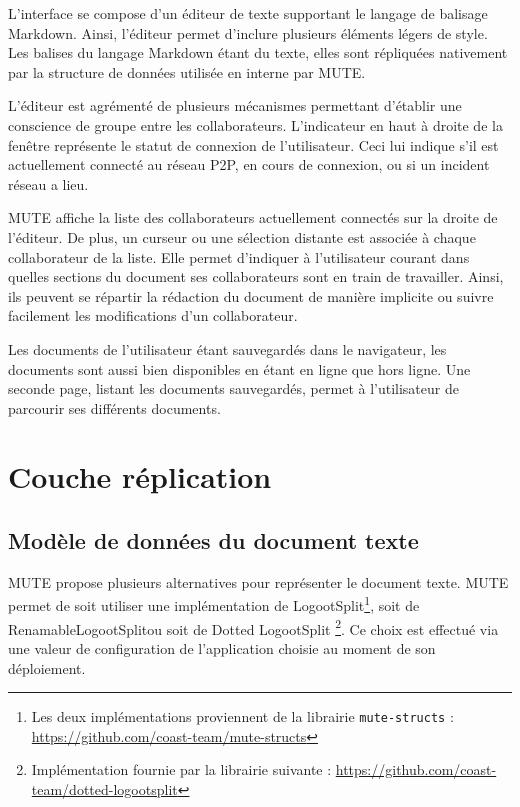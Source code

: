 \documentclass[12pt]{thesul}
\begin{document}
L'interface se compose d'un éditeur de texte supportant le langage de balisage Markdown.
Ainsi, l'éditeur permet d'inclure plusieurs éléments légers de style.
Les balises du langage Markdown étant du texte, elles sont répliquées nativement par la structure de données utilisée en interne par MUTE.

L'éditeur est agrémenté de plusieurs mécanismes permettant d'établir une conscience de groupe entre les collaborateurs.
L'indicateur en haut à droite de la fenêtre représente le statut de connexion de l'utilisateur.
Ceci lui indique s'il est actuellement connecté au réseau \ac{P2P}, en cours de connexion, ou si un incident réseau a lieu.

MUTE affiche la liste des collaborateurs actuellement connectés sur la droite de l'éditeur.
De plus, un curseur ou une sélection distante est associée à chaque collaborateur de la liste.
Elle permet d'indiquer à l'utilisateur courant dans quelles sections du document ses collaborateurs sont en train de travailler.
Ainsi, ils peuvent se répartir la rédaction du document de manière implicite ou suivre facilement les modifications d'un collaborateur.

Les documents de l'utilisateur étant sauvegardés dans le navigateur, les documents sont aussi bien disponibles en étant en ligne que hors ligne.
Une seconde page, listant les documents sauvegardés, permet à l'utilisateur de parcourir ses différents documents.

\section{Couche réplication}

\subsection{Modèle de données du document texte}

MUTE propose plusieurs alternatives pour représenter le document texte.
MUTE permet de soit utiliser une implémentation de LogootSplit\footnote{Les deux implémentations proviennent de la librairie \texttt{mute-structs} : \url{https://github.com/coast-team/mute-structs}}, soit de RenamableLogootSplit\footnotemark[\value{footnote}] ou soit de Dotted LogootSplit \footnote{Implémentation fournie par la librairie suivante : \url{https://github.com/coast-team/dotted-logootsplit}}.
Ce choix est effectué via une valeur de configuration de l'application choisie au moment de son déploiement.
\end{document}
